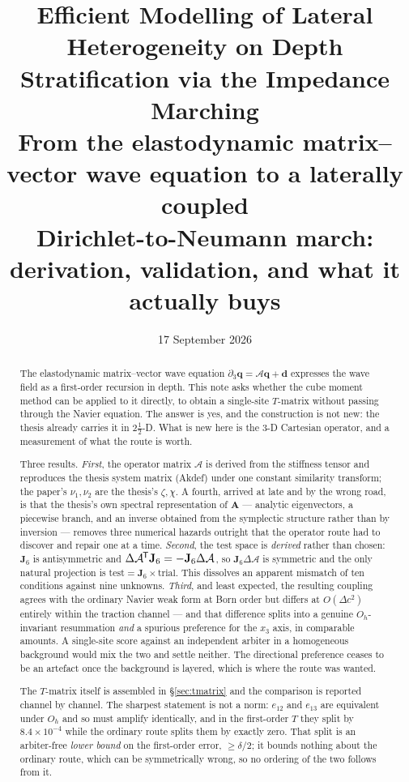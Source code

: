 \documentclass[11pt,a4paper]{article}
\title{\bfseries Efficient Modelling of Lateral Heterogeneity on Depth
Stratification via the Impedance Marching\\[4pt]
\large From the elastodynamic matrix--vector wave equation to a laterally
coupled\\ Dirichlet-to-Neumann march: derivation, validation, and what it
actually buys}
\author{}
\date{17 September 2026}
\newcommand{\bA}{\mathbf{A}}
\newcommand{\bq}{\mathbf{q}}
\newcommand{\bd}{\mathbf{d}}
\newcommand{\Aop}{\mathcal{A}}
\newcommand{\dA}{\Delta\mathcal{A}}
\newcommand{\Jsix}{\mathbf{J}_{6}}
\newcommand{\Oh}{O_{h}}
\newcommand{\tp}{^{\mkern-1.5mu\mathsf{T}}}
\begin{document}
\maketitle

\begin{abstract}
\noindent
The elastodynamic matrix--vector wave equation $\partial_3\bq = \Aop\bq + \bd$
expresses the wave field as a first-order recursion in depth.  This note asks
whether the cube moment method can be applied to it directly, to obtain a
single-site $T$-matrix without passing through the Navier equation.  The answer
is yes, and the construction is not new: the thesis already carries it in
$2\tfrac12$-D.  What is new here is the $3$-D Cartesian operator, and a
measurement of what the route is worth.

Three results.  \emph{First}, the operator matrix $\Aop$ is derived from the
stiffness tensor and reproduces the thesis system matrix (Akdef) under one
constant similarity transform; the paper's $\nu_1,\nu_2$ are the thesis's
$\zeta,\chi$.  A fourth, arrived at late and by the wrong road, is that the
thesis's own spectral representation of $\bA$ --- analytic eigenvectors, a
piecewise branch, and an inverse obtained from the symplectic structure rather
than by inversion --- removes three numerical hazards outright that the operator
route had to discover and repair one at a time.  \emph{Second}, the test space is
\emph{derived} rather than chosen: $\Jsix$ is antisymmetric and
$\dA\tp\Jsix = -\Jsix\dA$, so $\Jsix\dA$ is symmetric and the only natural
projection is $\text{test} = \Jsix\times\text{trial}$.  This dissolves an
apparent mismatch of ten conditions against nine unknowns.  \emph{Third}, and
least expected, the resulting coupling agrees with the ordinary Navier weak form
at Born order but differs at $O(\Delta c^{2})$ entirely within the traction
channel --- and that difference splits into a genuine $\Oh$-invariant
resummation \emph{and} a spurious preference for the $x_3$ axis, in comparable
amounts.  A single-site score against an independent arbiter in a homogeneous
background would mix the two and settle neither.  The directional preference
ceases to be an artefact once the background is layered, which is where the
route was wanted.

The $T$-matrix itself is assembled in \S\ref{sec:tmatrix} and the comparison is
reported channel by channel.  The sharpest statement is not a norm: $e_{12}$ and
$e_{13}$ are equivalent under $\Oh$ and so must amplify identically, and in the
first-order $T$ they split by $8.4\times10^{-4}$ while the ordinary route splits
them by exactly zero.  That split is an arbiter-free \emph{lower bound} on the
first-order error, $\ge\delta/2$; it bounds nothing about the ordinary route,
which can be symmetrically wrong, so no ordering of the two follows from it.


\end{abstract}
\end{document}
